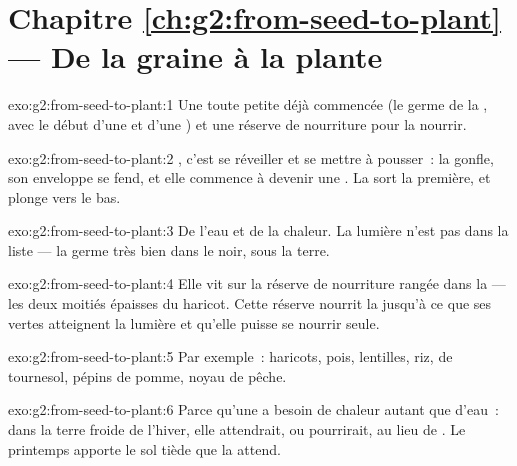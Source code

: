 \section*{Chapitre \ref{ch:g2:from-seed-to-plant} --- De la graine à la plante}

\begin{solution}{exo:g2:from-seed-to-plant:1}
Une toute petite  déjà commencée (le germe de la , avec
le début d'une  et d'une ) et une réserve de nourriture
pour la nourrir.
\end{solution}

\begin{solution}{exo:g2:from-seed-to-plant:2}
, c'est se réveiller et se mettre à pousser~: la 
gonfle, son enveloppe se fend, et elle commence à devenir une .
La  sort la première, et plonge vers le bas.
\end{solution}

\begin{solution}{exo:g2:from-seed-to-plant:3}
De l'eau et de la chaleur. La lumière n'est pas dans la liste --- la
 germe très bien dans le noir, sous la terre.
\end{solution}

\begin{solution}{exo:g2:from-seed-to-plant:4}
Elle vit sur la réserve de nourriture rangée dans la  --- les
deux moitiés épaisses du haricot. Cette réserve nourrit la  jusqu'à ce que ses  vertes atteignent la lumière et
qu'elle puisse se nourrir seule.
\end{solution}

\begin{solution}{exo:g2:from-seed-to-plant:5}
Par exemple~: haricots, pois, lentilles, riz,  de tournesol,
pépins de pomme, noyau de pêche.
\end{solution}

\begin{solution}{exo:g2:from-seed-to-plant:6}
Parce qu'une  a besoin de chaleur autant que d'eau~: dans la
terre froide de l'hiver, elle attendrait, ou pourrirait, au lieu de
. Le printemps apporte le sol tiède que la  attend.
\end{solution}

